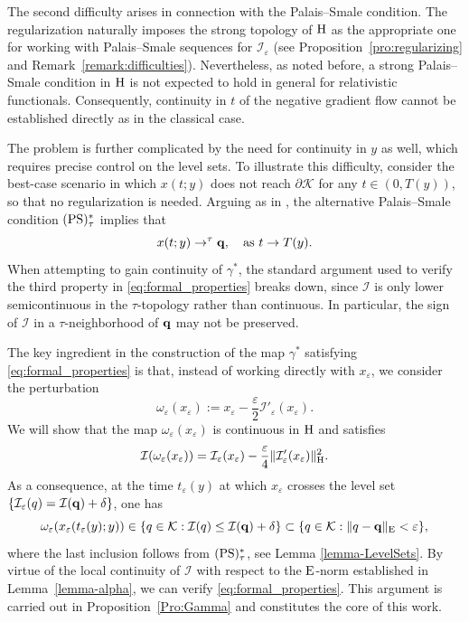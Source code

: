 \documentclass{article}
\newcommand{\boK}{\mathcal{K}}
\newcommand{\boI}{\mathcal{I}}
\newcommand{\Hilb}{{\textnormal H}}
\newcommand{\Ebanach}{{\textnormal E}}
\newcommand{\minq}{{\bf q}}
\newcommand{\PS}{(\textnormal{PS})^{*}_\tau}
\theoremstyle{definition}
\begin{document}
The second difficulty arises in connection with the Palais--Smale condition. The regularization naturally imposes the strong topology of $\Hilb$ as the appropriate one for working with Palais--Smale sequences for $\boI_\varepsilon$ (see Proposition~\ref{pro:regularizing} and Remark~\ref{remark:difficulties}). Nevertheless, as noted before, a strong Palais--Smale condition in $\Hilb$ is not expected to hold in general for relativistic functionals. Consequently, continuity in $t$ of the negative gradient flow cannot be established directly as in the classical case. 

The problem is further complicated by the need for continuity in $y$ as well, which requires precise control on the level sets. To illustrate this difficulty, consider the best-case scenario in which $x(t;y)$ does not reach $\partial\boK$ for any $t\in(0,T(y))$, so that no regularization is needed. Arguing as in \cite{Bre-Nir}, the alternative Palais--Smale condition $\PS$ implies that \[x(t;y)\to^\tau \minq,\quad\text{as }t\to T(y).\] When attempting to gain continuity of $\gamma^*$, the standard argument used to verify the third property in \eqref{eq:formal_properties} breaks down, since $\boI$ is only lower semicontinuous in the $\tau$-topology rather than continuous. In particular, the sign of $\boI$ in a $\tau$-neighborhood of $\minq$ may not be preserved. 

The key ingredient in the construction of the map $\gamma^*$ satisfying
\eqref{eq:formal_properties} is that, instead of working directly with $x_\varepsilon$, we consider the perturbation
\[\omega_\varepsilon(x_\varepsilon)
:=
x_\varepsilon-\frac{\varepsilon}{2}\boI'_\varepsilon(x_\varepsilon).
\]
We will show that the map $\omega_\varepsilon(x_\varepsilon)$ is continuous in $\Hilb$ and satisfies
\[
\boI(\omega_\varepsilon(x_\varepsilon))
=
\boI_\varepsilon(x_\varepsilon)
-
\frac{\varepsilon}{4}\|\boI'_\varepsilon(x_\varepsilon)\|_\Hilb^2.
\]
As a consequence, at the time $t_\varepsilon(y)$ at which $x_\varepsilon$ crosses the level set $\{\boI_\varepsilon(q)=\boI(\minq)+\delta\}$, one has
\begin{equation}
\omega_\varepsilon(x_\varepsilon(t_\varepsilon(y);y))
\in
\{q\in\boK:\boI(q)\le \boI(\minq)+\delta\}
\subset
\{q\in\boK:\|q-\minq\|_\Ebanach<\varepsilon\},
\end{equation}
where the last inclusion follows from  $\PS$, see Lemma \ref{lemma-LevelSets}. By virtue of the local continuity of $\boI$ with respect to the $\Ebanach$-norm established in Lemma~\ref{lemma-alpha}, we can verify \eqref{eq:formal_properties}. This argument is carried out in Proposition~\ref{Pro:Gamma} and
constitutes the core of this work.
\end{document}

